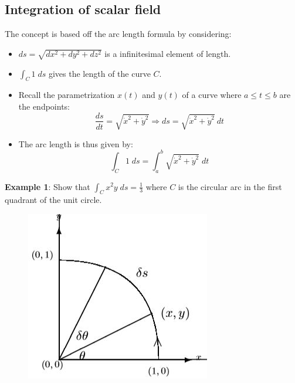 \documentclass[10pt,a4paper]{article}
\begin{document}
\subsection{Integration of scalar field}

The concept is based off the arc length formula by considering:
\begin{itemize}
    \item $ds = \sqrt{dx^2+dy^2+dz^2}$ is a infinitesimal element of length.
    \item $\int_C 1\;ds$ gives the length of the curve $C$.
\end{itemize} 

\begin{tcolorbox}[breakable,colback=white]
    \begin{itemize}
        \item Recall the parametrization $x(t)$ and $y(t)$ of a curve where $a\leq t \leq b$ are the endpoints:
        $$
            \frac{ds}{dt} = \sqrt{\dot{x}^2+\dot{y}^2} \Rightarrow ds = \sqrt{\dot{x}^2+\dot{y}^2}\: dt
        $$
        \item The arc length is thus given by:
        $$
            \int_C 1 \; ds = \int_a^b \sqrt{\dot{x}^2+\dot{y}^2}\; dt
        $$
    \end{itemize}
\end{tcolorbox}

\textbf{Example 1}: Show that $\int_C x^2y \; ds = \frac{1}{3}$ where $C$ is the circular arc in the
first quadrant of the unit circle.
\begin{figure} [h]
    \centering
    \includegraphics[scale=0.4]{Quad.JPG}
\end{figure}
\end{document}
